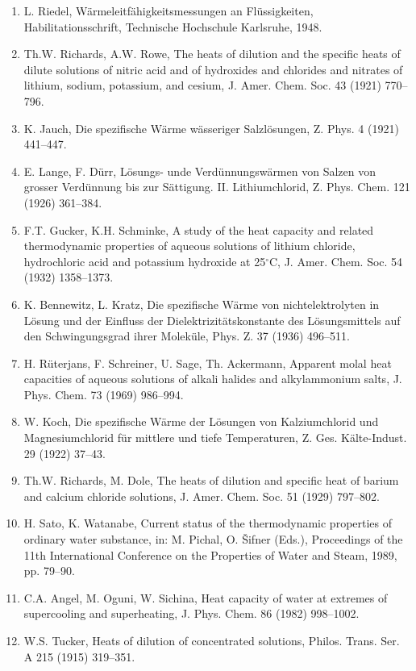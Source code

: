 \documentclass[11pt]{article}
\begin{document}
\begin{enumerate}
\item L. Riedel, W\"armeleitf\"ahigkeitsmessungen an Fl\"ussigkeiten, Habilitationsschrift, Technische Hochschule Karlsruhe, 1948.
\item Th.W. Richards, A.W. Rowe, The heats of dilution and the specific heats of dilute solutions of nitric acid and of hydroxides and chlorides and nitrates of lithium, sodium, potassium, and cesium, J. Amer. Chem. Soc. 43 (1921) 770--796.
\item K. Jauch, Die spezifische W\"arme w\"asseriger Salzl\"osungen, Z. Phys. 4 (1921) 441--447.
\item E. Lange, F. D\"urr, L\"osungs- unde Verd\"unnungsw\"armen von Salzen von grosser Verd\"unnung bis zur S\"attigung. II. Lithiumchlorid, Z. Phys. Chem. 121 (1926) 361--384.
\item F.T. Gucker, K.H. Schminke, A study of the heat capacity and related thermodynamic properties of aqueous solutions of lithium chloride, hydrochloric acid and potassium hydroxide at 25$^\circ$C, J. Amer. Chem. Soc. 54 (1932) 1358--1373.
\item K. Bennewitz, L. Kratz, Die spezifische W\"arme von nichtelektrolyten in L\"osung und der Einfluss der Dielektrizit\"atskonstante des L\"osungsmittels auf den Schwingungsgrad ihrer Molek\"ule, Phys. Z. 37 (1936) 496--511.
\item H. R\"uterjans, F. Schreiner, U. Sage, Th. Ackermann, Apparent molal heat capacities of aqueous solutions of alkali halides and alkylammonium salts, J. Phys. Chem. 73 (1969) 986--994.
\item W. Koch, Die spezifische W\"arme der L\"osungen von Kalziumchlorid und Magnesiumchlorid f\"ur mittlere und tiefe Temperaturen, Z. Ges. K\"alte-Indust. 29 (1922) 37--43.
\item Th.W. Richards, M. Dole, The heats of dilution and specific heat of barium and calcium chloride solutions, J. Amer. Chem. Soc. 51 (1929) 797--802.
\item H. Sato, K. Watanabe, Current status of the thermodynamic properties of ordinary water substance, in: M. Pichal, O. \v{S}ifner (Eds.), Proceedings of the 11th International Conference on the Properties of Water and Steam, 1989, pp. 79--90.
\item C.A. Angel, M. Oguni, W. Sichina, Heat capacity of water at extremes of supercooling and superheating, J. Phys. Chem. 86 (1982) 998--1002.
\item W.S. Tucker, Heats of dilution of concentrated solutions, Philos. Trans. Ser. A 215 (1915) 319--351.

\end{enumerate}
\end{document}
